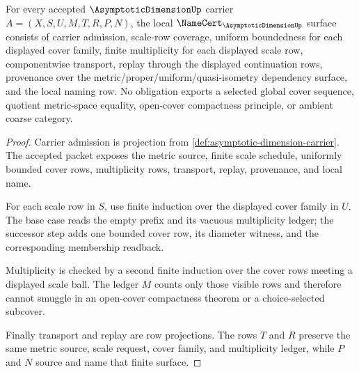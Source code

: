 \begin{theorem}
\label{thm:asymptotic-dimension-namecert-obligations}
For every accepted $\AsymptoticDimensionUp$ carrier $A=(X,S,U,M,T,R,P,N)$, the local $\NameCert_{\AsymptoticDimensionUp}$ surface consists of carrier admission, scale-row coverage, uniform boundedness for each displayed cover family, finite multiplicity for each displayed scale row, componentwise transport, replay through the displayed continuation rows, provenance over the metric/proper/uniform/quasi-isometry dependency surface, and the local naming row. No obligation exports a selected global cover sequence, quotient metric-space equality, open-cover compactness principle, or ambient coarse category.
\end{theorem}
\begin{proof}
Carrier admission is projection from \autoref{def:asymptotic-dimension-carrier}. The accepted packet exposes the metric source, finite scale schedule, uniformly bounded cover rows, multiplicity rows, transport, replay, provenance, and local name.

For each scale row in $S$, use finite induction over the displayed cover family in $U$. The base case reads the empty prefix and its vacuous multiplicity ledger; the successor step adds one bounded cover row, its diameter witness, and the corresponding membership readback.

Multiplicity is checked by a second finite induction over the cover rows meeting a displayed scale ball. The ledger $M$ counts only those visible rows and therefore cannot smuggle in an open-cover compactness theorem or a choice-selected subcover.

Finally transport and replay are row projections. The rows $T$ and $R$ preserve the same metric source, scale request, cover family, and multiplicity ledger, while $P$ and $N$ source and name that finite surface.
\end{proof}

